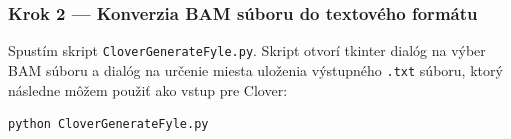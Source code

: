 \subsubsection*{Krok 2 — Konverzia BAM súboru do textového formátu}
Spustím skript \texttt{CloverGenerateFyle.py}. Skript otvorí tkinter dialóg na výber BAM súboru a dialóg na určenie miesta uloženia výstupného \texttt{.txt} súboru, ktorý následne môžem použiť ako vstup pre Clover:
\begin{verbatim}
python CloverGenerateFyle.py
\end{verbatim}
